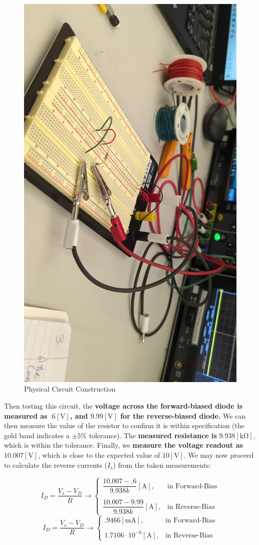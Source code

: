 \documentclass[
	letterpaper, %
	10pt, %
]{CSUniSchoolLabReport}
\begin{document}
\begin{figure}[H]
  \centering
  \includegraphics[width=.75\textwidth]{Figures/L2F2}
  \caption{Physical Circuit Construction}
  \label{fig:2}
\end{figure}

Then testing this circuit, the \textbf{voltage across the forward-biased diode is measured as $.6[\si{\volt}]$, and $9.99[\si{\volt}]$ for the reverse-biased diode.} We can then measure the value of the resistor to confirm it is within specification (the gold band indicates a $\pm5\%$ tolerance). The \textbf{measured resistance is} $9.938[\si{\kilo\ohm}]$, which is within the tolerance. Finally, we \textbf{measure the voltage readout as} $10.007[\si{\volt}]$, which is close to the expected value of $10[\si{\volt}]$. We may now proceed to calculate the reverse currents ($I_s$) from the taken measurements:

  $$I_D=\dfrac{V_s-V_D}{R}\to\left\{\begin{array}{ll} \dfrac{10.007-.6}{9.938k}[\si{\ampere}], &\text{in Forward-Bias}\\\\ \dfrac{10.007-9.99}{9.938k}[\si{\ampere}], &\text{in Reverse-Bias}\end{array}$$
  $$\boxed{I_D=\dfrac{V_s-V_D}{R}\to\left\{\begin{array}{ll}.9466[\si{\milli\ampere}], &\text{in Forward-Bias}\\\\ 1.7106\cdot10^{-6}[\si{\ampere}], &\text{in Reverse-Bias}\end{array}}$$
\end{document}
